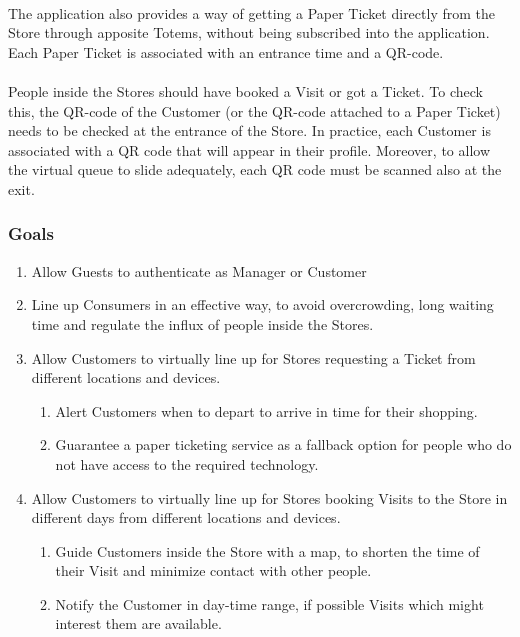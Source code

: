 \documentclass[a4paper, 12pt, oneside]{article}
\begin{document}
\\
The application also provides a way of getting a Paper Ticket directly from the Store through apposite Totems, without being subscribed into the application. Each Paper Ticket is associated with an entrance time and a QR-code.\\
\\
People inside the Stores should have booked a Visit or got a Ticket. To check this, the QR-code of the Customer (or the QR-code attached to a Paper Ticket) needs to be checked at the entrance of the Store. In practice, each Customer is associated with a QR code that will appear in their profile. Moreover, to allow the virtual queue to slide adequately, each QR code must be scanned also at the exit.

\subsubsection{Goals}

\begin{enumerate}[label={G.\arabic{*}}]
    \item \label{goal:auth} Allow Guests to authenticate as Manager or Customer
    \item \label{goal:effectiveQueue} Line up Consumers in an effective way, to avoid overcrowding, long waiting time and regulate the influx of people inside the Stores.
    \item \label{goal:enqueue} Allow Customers to virtually line up for Stores requesting a Ticket from different locations and devices.
    \begin{enumerate}[label={\ref{goal:enqueue}.\arabic{*}}]
        \item \label{goal:enqueue:time} Alert Customers when to depart to arrive in time for their shopping.
        \item \label{goal:enqueue:fallback} Guarantee a paper ticketing service as a fallback option for people who do not have access to the required technology.
    \end{enumerate}
    \item \label{goal:visit} Allow Customers to virtually line up for Stores booking Visits to the Store in different days from different locations and devices.
    \begin{enumerate}[label={\ref{goal:visit}.\arabic{*}}]
        \item \label{goal:visit:path} Guide Customers inside the Store with a map, to shorten the time of their Visit and minimize contact with other people.
        \item \label{goal:visit:notifications} Notify the Customer in day-time range, if possible Visits which might interest them are available.
    \end{enumerate}
\end{enumerate}
\end{document}
